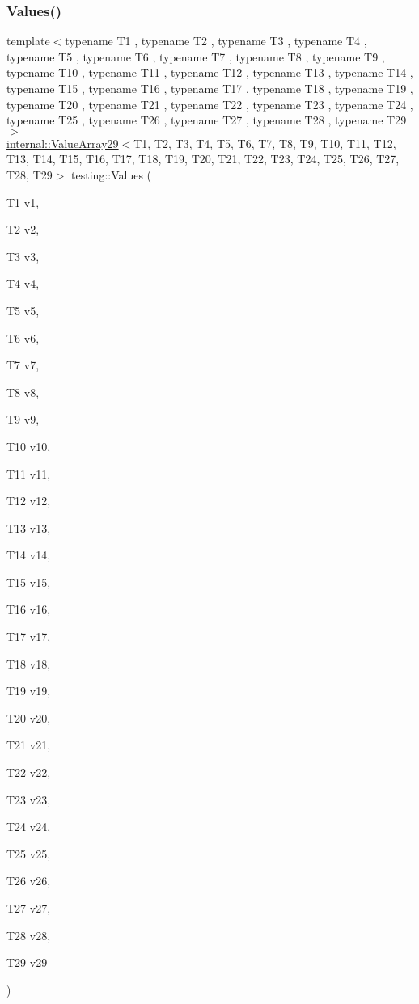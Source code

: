 \mbox{\label{namespacetesting_a3d8a9bd3f027d89ff2873e3f0ff396cb}} 
\subsubsection{\texorpdfstring{Values()}{Values()}\hspace{0.1cm}{\footnotesize\ttfamily [29/50]}}
{\footnotesize\ttfamily template$<$typename T1 , typename T2 , typename T3 , typename T4 , typename T5 , typename T6 , typename T7 , typename T8 , typename T9 , typename T10 , typename T11 , typename T12 , typename T13 , typename T14 , typename T15 , typename T16 , typename T17 , typename T18 , typename T19 , typename T20 , typename T21 , typename T22 , typename T23 , typename T24 , typename T25 , typename T26 , typename T27 , typename T28 , typename T29 $>$ \\
\mbox{\hyperlink{classtesting_1_1internal_1_1ValueArray29}{internal\+::\+Value\+Array29}}$<$T1, T2, T3, T4, T5, T6, T7, T8, T9, T10, T11, T12, T13, T14, T15, T16, T17, T18, T19, T20, T21, T22, T23, T24, T25, T26, T27, T28, T29$>$ testing\+::\+Values (\begin{DoxyParamCaption}\item[{T1}]{v1,  }\item[{T2}]{v2,  }\item[{T3}]{v3,  }\item[{T4}]{v4,  }\item[{T5}]{v5,  }\item[{T6}]{v6,  }\item[{T7}]{v7,  }\item[{T8}]{v8,  }\item[{T9}]{v9,  }\item[{T10}]{v10,  }\item[{T11}]{v11,  }\item[{T12}]{v12,  }\item[{T13}]{v13,  }\item[{T14}]{v14,  }\item[{T15}]{v15,  }\item[{T16}]{v16,  }\item[{T17}]{v17,  }\item[{T18}]{v18,  }\item[{T19}]{v19,  }\item[{T20}]{v20,  }\item[{T21}]{v21,  }\item[{T22}]{v22,  }\item[{T23}]{v23,  }\item[{T24}]{v24,  }\item[{T25}]{v25,  }\item[{T26}]{v26,  }\item[{T27}]{v27,  }\item[{T28}]{v28,  }\item[{T29}]{v29 }\end{DoxyParamCaption})}

